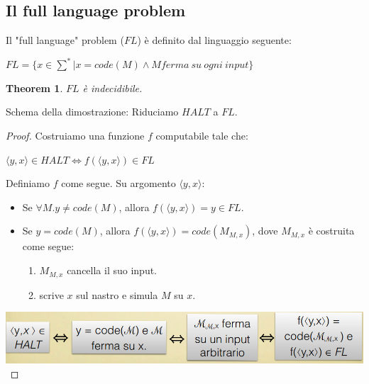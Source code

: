 \documentclass[a4paper, 12pt]{article}
\newtheorem{theorem}{Theorem}[section]
\begin{document}
\subsection{Il full language problem}
Il "full language" problem ($FL$) \`e definito dal linguaggio seguente:
\begin{center}
$FL = \{x \in \sum^* | x=code(M) \land M ferma\ su\ ogni\ input\}$
\end{center}
\begin{theorem}
$FL$ \`e indecidibile.
\end{theorem}
Schema della dimostrazione: Riduciamo $HALT$ a $FL$.
\begin{proof}
Costruiamo una funzione $f$ computabile tale che: 
\begin{center}
$\langle y,x \rangle \in HALT \iff f(\langle y,x \rangle) \in FL$
\end{center}
Definiamo $f$ come segue. Su argomento $\langle y,x \rangle$:
\begin{itemize}
\item Se $\forall M.y \neq code(M)$, allora $f(\langle y,x \rangle) = y \in FL$.
\item Se $y =code(M)$, allora $f(\langle y,x \rangle) = code(M_{M,x})$, dove $M_{M,x}$ \`e costruita come segue:
\begin{enumerate}
\item $M_{M,x}$ cancella il suo input.
\item scrive $x$ sul nastro e simula $M$ su $x$.
\end{enumerate}
\end{itemize}
\includegraphics[scale=0.45]{FL1.png}\\
\end{proof}
\end{document}
